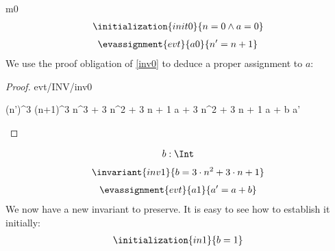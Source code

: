 \documentclass[12pt]{amsart}
\begin{document}
\begin{machine}{m0}
%
\begin{align*}
\initialization{init0}
{	n = 0 \land a = 0	}
\end{align*}
\begin{align*}
\evassignment{evt}{a0}
{	n' = n + 1	}
\end{align*}
%
We use the proof obligation of \ref{inv0} to deduce a proper assignment to $a$:
%
\begin{proof}{evt/INV/inv0}
	\begin{calculation}
		(n')^3
	\hint{=}{ \ref{a0} }
		(n+1)^3
		n^3 + 3 \cdot n^2 + 3 \cdot n + 1
	\hint{=}{ \ref{inv0} }
		a + 3 \cdot n^2 + 3 \cdot n + 1
		a + b
	\hint{=}{ \ref{a1} }
		a'
	\end{calculation}
\end{proof}
%
\begin{align*}
\variable{	b : \Int}
\end{align*}
%
\begin{align*}
\invariant{inv1}
{	b = 3 \cdot n^2 + 3 \cdot n + 1	}
\end{align*}
\begin{align*}
\evassignment{evt}{a1}
{	a' = a + b	}
\end{align*}
%
We now have a new invariant to preserve. It is easy to see how to establish it initially:
\begin{align*}
\initialization{in1}
{	b = 1	}
\end{align*}
%
%
%	
%

\end{machine}
\end{document}
